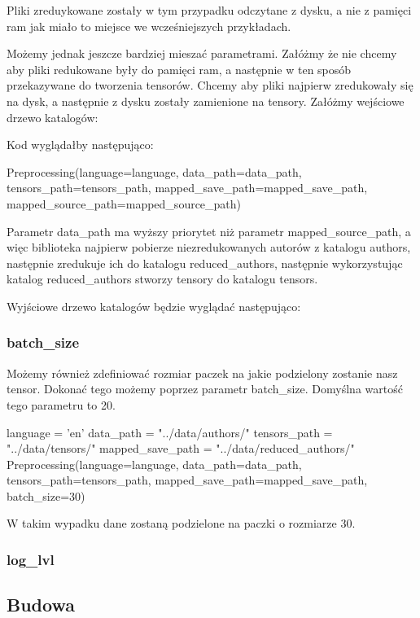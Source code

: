 Pliki zreduykowane zostały w tym przypadku odczytane z dysku, a nie z pamięci ram jak miało to miejsce
we wcześniejszych przykładach. 
\newline

Możemy jednak jeszcze bardziej mieszać parametrami. Załóżmy że nie chcemy aby pliki redukowane były
do pamięci ram, a następnie w ten sposób przekazywane do tworzenia tensorów. Chcemy aby pliki najpierw
zredukowały się na dysk, a następnie z dysku zostały zamienione na tensory. 
Załóżmy wejściowe drzewo katalogów:

\myspace
{}
\myspace

Kod wyglądałby następująco:
\begin{python}
Preprocessing(language=language,
              data_path=data_path,
              tensors_path=tensors_path,
              mapped_save_path=mapped_save_path,
              mapped_source_path=mapped_source_path)

\end{python}

Parametr data\_path ma wyższy priorytet niż parametr mapped\_source\_path, a więc biblioteka najpierw 
pobierze niezredukowanych autorów z katalogu authors, następnie zredukuje ich do katalogu reduced\_authors,
następnie wykorzystując katalog reduced\_authors stworzy tensory do katalogu tensors.

Wyjściowe drzewo katalogów będzie wyglądać następująco:

\myspace
{}

\myspace

\subsubsection{batch\_size}
Możemy również zdefiniować rozmiar paczek na jakie podzielony zostanie nasz tensor. Dokonać tego możemy poprzez
parametr batch\_size. Domyślna wartość tego parametru to 20.

\begin{python}
language = 'en'
data_path = "../data/authors/"
tensors_path = "../data/tensors/"
mapped_save_path = "../data/reduced_authors/"
Preprocessing(language=language,
              data_path=data_path,
              tensors_path=tensors_path,
              mapped_save_path=mapped_save_path,
              batch_size=30)

\end{python}

W takim wypadku dane zostaną podzielone na paczki o rozmiarze 30.
                  
\subsubsection{log\_lvl}
\subsection{Budowa}